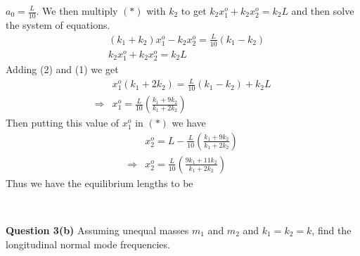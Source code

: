 \documentclass[addpoints]{exam}
\begin{document}
\begin{questions}
\begin{solution}
    $a_0 =\frac{L}{10}$. We then multiply $(*)$ with $k_2$ to get $k_2x_1^o + k_2x_2^o = k_2L$ and then solve the system of equations.
    \begin{align}
        &(k_1+k_2)x_1^o-k_2 x_2^o = \frac{L}{10}(k_1-k_2)\\ 
        &k_2x_1^o + k_2x_2^o = k_2L 
    \end{align}
    Adding (2) and (1) we get 
    \begin{align*}
        &x_1^o(k_1+2k_2) = \frac{L}{10}(k_1-k_2) + k_2 L \\ 
        \Rightarrow & x_1^o = \frac{L}{10}\left(\frac{k_1+9k_2}{k_1+2k_2}\right)
    \end{align*}
    Then putting this value of $x_1^o$ in $(*)$ we have 
    \begin{align*}
        &x_2^o = L - \frac{L}{10}\left(\frac{k_1+9k_2}{k_1+2k_2}\right)\\ 
        \Rightarrow &  x_2^o = \frac{L}{10}\left(\frac{9k_1+11k_2}{k_1+2k_2}\right)
    \end{align*}
    Thus we have the equilibrium lengths to be
    \begin{center}
         \\
    \end{center} 
    
\end{solution}


\textbf{ Question 3(b)}
Assuming unequal masses $m_1$ and $m_2$ and $k_1 = k_2 =k$, find the longitudinal normal mode frequencies.


\end{questions}
\end{document}

